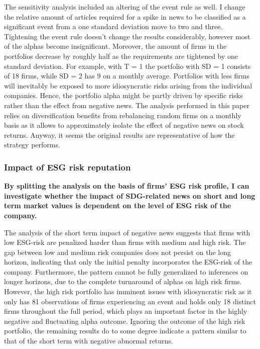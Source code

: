 The sensitivity analysis included an altering of the event rule as well. I change the relative amount of articles required for a spike in news to be classified as a significant event from a one standard deviation move to two and three. Tightening the event rule doesn't change the results considerably, however most of the alphas become insignificant. Moreover, the amount of firms in the portfolios decrease by roughly half as the requirements are tightened by one standard deviation. For example, with T = 1 the portfolio with SD = 1 consists of 18 firms, while SD = 2 has 9 on a monthly average. Portfolios with less firms will inevitably be exposed to more idiosyncratic risks arising from the individual companies. Hence, the portfolio alpha  might be partly driven by specific risks rather than the effect from negative news. The analysis performed in this paper relies on diversification benefits from rebalancing random firms on a monthly basis as it allows to approximately isolate the effect of negative news on stock returns. Anyway, it seems the original results are representative of how the strategy performs. 

\subsubsection{Impact of ESG risk reputation}

\textbf{By splitting the analysis on the basis of firms’ ESG risk profile, I can investigate whether the impact of SDG-related news on short and long term market values is dependent on the level of ESG risk of the company.}


The analysis of the short term impact of negative news suggests that firms with low ESG-risk are penalized harder than firms with medium and high risk. The gap between low and medium risk companies does not persist on the long horizon, indicating that only the initial penalty incorporates the ESG-risk of the company. 
Furthermore, the pattern cannot be fully generalized to inferences on longer horizons, due to the complete turnaround of alphas on high risk firms. However, the high risk portfolio has imminent issues with idiosyncratic risk as it only has 81 observations of firms experiencing an event and holds only 18 distinct firms throughout the full period, which plays an important factor in the highly negative and fluctuating alpha outcome. Ignoring the outcome of the high risk portfolio, the remaining results do to some degree indicate a pattern similar to that of the short term with negative abnormal returns.

